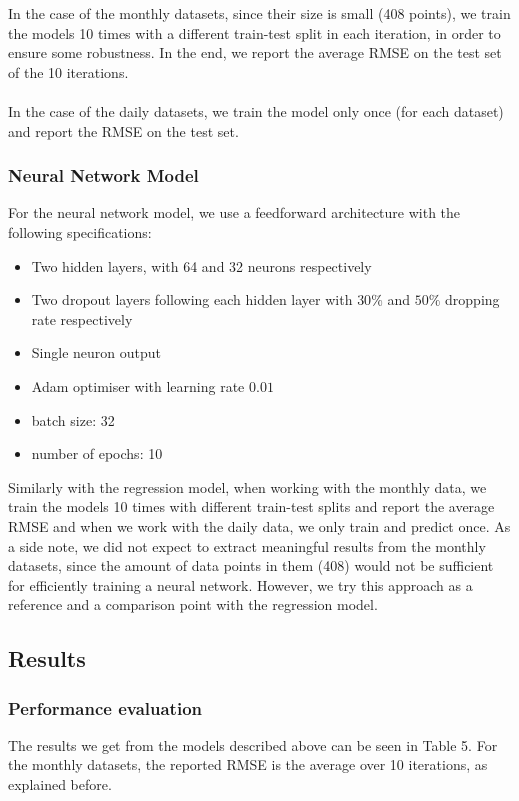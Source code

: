 \documentclass{article}
\begin{document}
In the case of the monthly datasets, since their size is small (408 points), we train the models 10 times with a different train-test split in each iteration, in order to ensure some robustness. In the end, we report the average RMSE on the test set of the 10 iterations.
\\
\\
In the case of the daily datasets, we train the model only once (for each dataset) and report the RMSE on the test set.

\subsubsection{Neural Network Model}

For the neural network model, we use a feedforward architecture with the following specifications:
\begin{itemize}
    \item Two hidden layers, with 64 and 32 neurons respectively
    \item Two dropout layers following each hidden layer with $30\%$ and $50\%$ dropping rate respectively
    \item Single neuron output
    \item Adam optimiser with learning rate $0.01$
    \item batch size: 32
    \item number of epochs: 10

\end{itemize}
Similarly with the regression model, when working with the monthly data, we train the models 10 times with different train-test splits and report the average RMSE and when we work with the daily data, we only train and predict once. As a side note, we did not expect to extract meaningful results from the monthly datasets, since the amount of data points in them (408) would not be sufficient for efficiently training a neural network. However, we try this approach as a reference and a comparison point with the regression model.

\subsection{Results}

\subsubsection{Performance evaluation}
The results we get from the models described above can be seen in Table 5. For the monthly datasets, the reported RMSE is the average over 10 iterations, as explained before.
\end{document}

